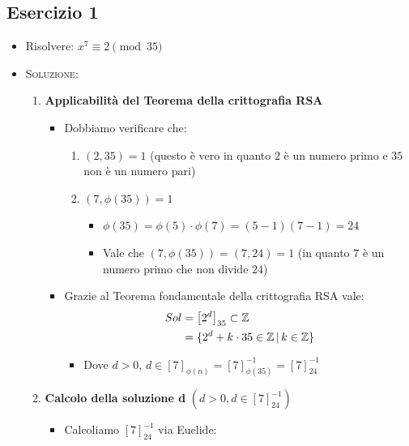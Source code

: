 \documentclass[10pt]{article}
\begin{document}
	\subsection{Esercizio 1}
		\begin{itemize}
		\item
		Risolvere: $x^7 \equiv 2 \pmod{35}$
		\item
		\textsc{Soluzione:}
		\begin{enumerate}
		\item
		\textbf{Applicabilità del Teorema della crittografia RSA}
		\begin{itemize}
		\item
		Dobbiamo verificare che:
		\begin{enumerate}
		\item
		$(2,35)=1$ {\small (questo è vero in quanto $2$ è un numero primo e $35$ non è un numero pari)}
		\item
		$(7,\phi(35)) = 1$
		\begin{itemize}
		\item
		$\phi(35) = \phi(5) \cdot \phi(7) = (5-1)(7-1) = 24$
		\item
		Vale che $(7,\phi(35)) = (7,24) = 1$ {\small(in quanto $7$ è un numero primo che non divide $24$)}
		\end{itemize}
		\end{enumerate}
		\item
		Grazie al Teorema fondamentale della crittografia RSA vale:
		\begin{equation}
		\begin{split}
		Sol &= \left[2^d\right]_{35} \subset \mathbb{Z} \\
		&= \{2^d + k \cdot 35 \in \mathbb{Z} \,|\, k \in \mathbb{Z}\}
		\notag
		\end{split}
		\end{equation} 
		\begin{itemize}
		\item
		Dove $d > 0$, $d \in \left[7\right]_{\phi(n)} = \left[7\right]_{\phi(35)}^{-1} = \left[7\right]_{24}^{-1}$
		\end{itemize}
		\end{itemize}
		\item
		\textbf{Calcolo della soluzione d} $\displaystyle{(d > 0, d \in \left[7\right]_{24}^{-1})}$
		\begin{itemize}
		\item
		Calcoliamo $\left[7\right]_{24}^{-1}$ via Euclide:
		\begin{equation}
		\begin{split}

\end{split}
\end{equation}
\end{itemize}
\end{enumerate}
\end{itemize}
\end{document}
